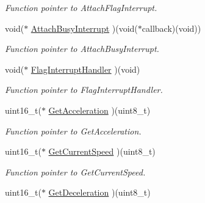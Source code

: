 \begin{DoxyCompactItemize}
\begin{DoxyCompactList}\small\item\em Function pointer to Attach\+Flag\+Interrupt. \end{DoxyCompactList}\item 
\mbox{\label{structmotor_drv__t_a093d8ad30fd271e344195dbde36b8a2e}} 
void($\ast$ \mbox{\hyperlink{structmotor_drv__t_a093d8ad30fd271e344195dbde36b8a2e}{Attach\+Busy\+Interrupt}} )(void($\ast$callback)(void))
\begin{DoxyCompactList}\small\item\em Function pointer to Attach\+Busy\+Interrupt. \end{DoxyCompactList}\item 
\mbox{\label{structmotor_drv__t_ab2dfca0996212691221964294195a441}} 
void($\ast$ \mbox{\hyperlink{structmotor_drv__t_ab2dfca0996212691221964294195a441}{Flag\+Interrupt\+Handler}} )(void)
\begin{DoxyCompactList}\small\item\em Function pointer to Flag\+Interrupt\+Handler. \end{DoxyCompactList}\item 
\mbox{\label{structmotor_drv__t_a371a0207f336ecb38bd0fdb047b8c683}} 
uint16\+\_\+t($\ast$ \mbox{\hyperlink{structmotor_drv__t_a371a0207f336ecb38bd0fdb047b8c683}{Get\+Acceleration}} )(uint8\+\_\+t)
\begin{DoxyCompactList}\small\item\em Function pointer to Get\+Acceleration. \end{DoxyCompactList}\item 
\mbox{\label{structmotor_drv__t_a2c2ce036e0f91aac0658806665c68361}} 
uint16\+\_\+t($\ast$ \mbox{\hyperlink{structmotor_drv__t_a2c2ce036e0f91aac0658806665c68361}{Get\+Current\+Speed}} )(uint8\+\_\+t)
\begin{DoxyCompactList}\small\item\em Function pointer to Get\+Current\+Speed. \end{DoxyCompactList}\item 
\mbox{\label{structmotor_drv__t_a82d706c0ca281f85f83f65e5b3ecb747}} 
uint16\+\_\+t($\ast$ \mbox{\hyperlink{structmotor_drv__t_a82d706c0ca281f85f83f65e5b3ecb747}{Get\+Deceleration}} )(uint8\+\_\+t)

\end{DoxyCompactItemize}
